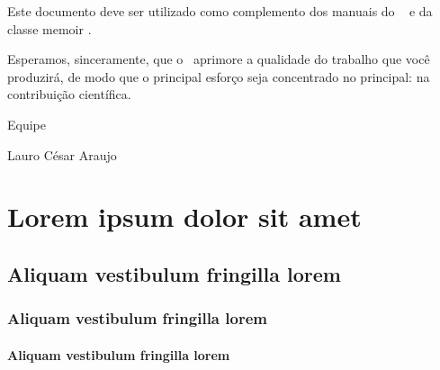 \documentclass[
	12pt,				%
	openright,			%
	oneside,			%
	a4paper,			%
	tcc,			%
	]{ABNT-DC-UEL}
\begin{document}
Este documento deve ser utilizado como complemento dos manuais do \abnTeX\ 
\cite{abntex2classe,abntex2cite,abntex2cite-alf} e da classe \textsf{memoir}
\cite{memoir}. 

Esperamos, sinceramente, que o \abnTeX\ aprimore a qualidade do trabalho que
você produzirá, de modo que o principal esforço seja concentrado no principal:
na contribuição científica.

Equipe \abnTeX 

Lauro César Araujo







\chapter{Lorem ipsum dolor sit amet}

\section{Aliquam vestibulum fringilla lorem}

\lipsum[1]

\subsection{Aliquam vestibulum fringilla lorem}

\lipsum[2]

\subsubsection{Aliquam vestibulum fringilla lorem}

\lipsum[3]
\end{document}
